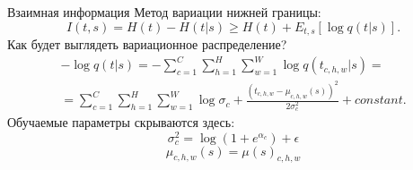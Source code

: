 \documentclass{beamer}
\begin{document}

\begin{frame}{Взаимная информация}
    Метод вариации нижней границы:
    \begin{equation}
        I(t, s) = H(t) - H(t|s) \geq  H(t) + E_{t,s}[\log{q(t|s)}].
    \end{equation}
    Как будет выглядеть вариационное распределение?
    \begin{multline}
        -\log{q(t|s)} = -\sum_{c=1}^{C}  \sum_{h=1}^{H} \sum_{w=1}^{W} \log{q(t_{c,h,w}|s)} = \\
        = \sum_{c=1}^{C}  \sum_{h=1}^{H} \sum_{w=1}^{W} \log{\sigma_c} + \frac{(t_{c,h,w} - \mu_{c,h,w}(s))^2}{2\sigma_c^2} + constant.
    \end{multline}
    Обучаемые параметры скрываются здесь:
    $$\sigma^2_c = \log{(1 + e^{\alpha_c})} + \epsilon$$
    $$\mu_{c,h,w}(s) = \mu(s)_{c,h,w}$$
\end{frame}

\end{document}

